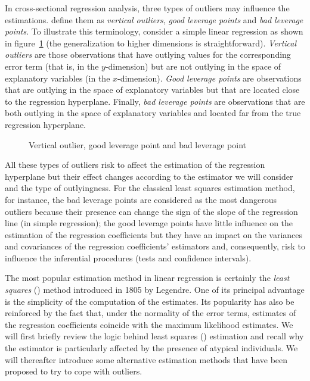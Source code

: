 In cross-sectional regression analysis, three types of outliers may influence
the estimations. \citet{rousseeuw:leroy:1987} define them as \emph{vertical
outliers}, \emph{good leverage points} and \emph{bad leverage points}. To
illustrate this terminology, consider a simple linear regression as shown in
figure~\ref{fig:outlier_types} (the generalization to higher dimensions is
straightforward). \emph{Vertical outliers} are those observations that have
outlying values for the corresponding error term (that is, in the
$y$-dimension) but are not outlying in the space of explanatory variables (in
the $x$-dimension). \emph{Good leverage points} are observations that are
outlying in the space of explanatory variables but that are located close to
the regression hyperplane. Finally, \emph{bad leverage points} are observations
that are both outlying in the space of explanatory variables and located far
from the true regression hyperplane.


\begin{figure}[h!]
    \centering
    \caption{Vertical outlier, good leverage point and bad leverage point}
    \label{fig:outlier_types}
\end{figure}

All these types of outliers risk to affect the estimation of the regression
hyperplane but their effect changes according to the estimator we will
consider and the type of outlyingness. For the classical least squares
estimation method, for instance, the bad leverage points are considered as the
most dangerous outliers because their presence can change the sign of the
slope of the regression line (in simple regression); the good leverage points
have little influence on the estimation of the regression coefficients but
they have an impact on the variances and covariances of the regression
coefficients' estimators and, consequently, risk to influence the inferential
procedures (tests and confidence intervals).

The most popular estimation method in linear regression is certainly the
\emph{least squares} () method introduced in 1805 by Legendre.          
One of its principal advantage is the simplicity of the
computation of the  estimates. Its popularity has also be reinforced
by the fact that, under the normality of the error terms,  estimates
of the regression coefficients coincide with the maximum likelihood estimates.
We will first briefly review the logic behind least squares ()
estimation and recall why the  estimator is particularly affected by
the presence of atypical individuals. We will thereafter introduce some
alternative estimation methods that have been proposed to try to cope with
outliers.



